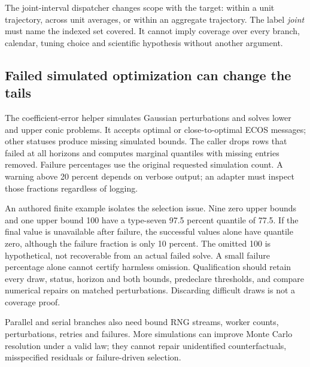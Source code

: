 The joint-interval dispatcher changes scope with the target: within a unit
trajectory, across unit averages, or within an aggregate trajectory. The
label \emph{joint} must name the indexed set covered. It cannot imply
coverage over every branch, calendar, tuning choice and scientific
hypothesis without another argument.\citep{exec24_scpi_source,exec24_scpi_choice}

\subsection{Failed simulated optimization can change the tails}
The coefficient-error helper simulates Gaussian perturbations and solves
lower and upper conic problems. It accepts optimal or close-to-optimal
ECOS messages; other statuses produce missing simulated bounds. The caller
drops rows that failed at all horizons and computes marginal quantiles
with missing entries removed. Failure percentages use the original
requested simulation count. A warning above 20 percent depends on verbose
output; an adapter must inspect those fractions regardless of logging.
\citep{exec24_scpi_source}

An authored finite example isolates the selection issue. Nine zero upper
bounds and one upper bound 100 have a type-seven 97.5 percent quantile of
77.5. If the final value is unavailable after failure, the successful
values alone have quantile zero, although the failure fraction is only
10 percent. The omitted 100 is hypothetical, not recoverable from an
actual failed solve. A small failure percentage alone cannot certify
harmless omission. Qualification should retain every draw, status, horizon
and both bounds, predeclare thresholds, and compare numerical repairs on
matched perturbations. Discarding difficult draws is not a coverage proof.
\citep{exec24_scpi_choice}

Parallel and serial branches also need bound RNG streams, worker counts,
perturbations, retries and failures. More simulations can improve Monte
Carlo resolution under a valid law; they cannot repair unidentified
counterfactuals, misspecified residuals or failure-driven selection.
\citep{exec24_scpi_source,exec24_scpi_choice}

